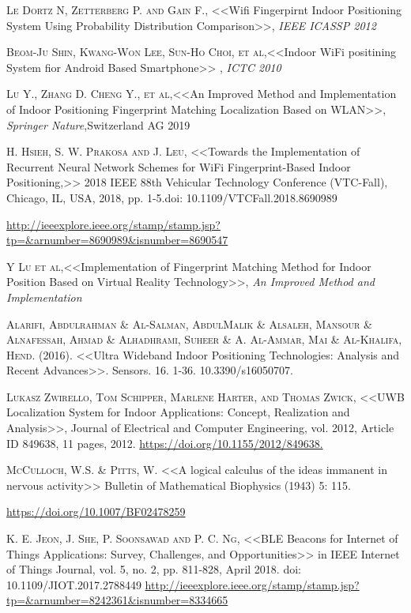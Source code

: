 \documentclass[12pt]{report}
\begin{document}
\begin{thebibliography}{X}
 \textsc{Le Dortz N, Zetterberg P. and Gain F.}, <<Wifi Fingerpirnt Indoor Positioning System Using Probability Distribution Comparison>>, \textit{IEEE ICASSP 2012}

 \textsc{Beom-Ju Shin, Kwang-Won Lee, Sun-Ho Choi, et al},<<Indoor WiFi positining System fior Android Based Smartphone>> , \textit{ICTC 2010}

 \textsc{Lu Y., Zhang D. Cheng Y., et al},<<An Improved Method and Implementation of Indoor Positioning Fingerprint Matching Localization Based on WLAN>>, \textit{Springer Nature},Switzerland AG 2019

\textsc{H. Hsieh, S. W. Prakosa and J. Leu}, <<Towards the Implementation of Recurrent Neural Network Schemes for WiFi Fingerprint-Based Indoor Positioning,>> 2018 IEEE 88th Vehicular Technology Conference (VTC-Fall), Chicago, IL, USA, 2018, pp. 1-5.doi: 10.1109/VTCFall.2018.8690989

\url{http://ieeexplore.ieee.org/stamp/stamp.jsp?tp=&arnumber=8690989&isnumber=8690547}

 \textsc{Y Lu et al},<<Implementation of Fingerprint Matching Method for Indoor Position Based on Virtual Reality Technology>>, \textit{An Improved Method and Implementation}

 \textsc{Alarifi, Abdulrahman \& Al-Salman, AbdulMalik \& Alsaleh, Mansour \& Alnafessah, Ahmad \& Alhadhrami, Suheer \& A. Al-Ammar, Mai \& Al-Khalifa, Hend}. (2016). <<Ultra Wideband Indoor Positioning Technologies: Analysis and Recent Advances>>. Sensors. 16. 1-36. 10.3390/s16050707.

 \textsc{Lukasz Zwirello, Tom Schipper, Marlene Harter, and Thomas Zwick}, <<UWB Localization System for Indoor Applications: Concept, Realization and Analysis>>, Journal of Electrical and Computer Engineering, vol. 2012, Article ID 849638, 11 pages, 2012. \url{https://doi.org/10.1155/2012/849638.}

\textsc{McCulloch, W.S. \& Pitts, W.} <<A logical calculus of the ideas immanent in nervous activity>> Bulletin of Mathematical Biophysics (1943) 5: 115. 

\url{https://doi.org/10.1007/BF02478259}

 \textsc{K. E. Jeon, J. She, P. Soonsawad and P. C. Ng}, <<BLE Beacons for Internet of Things Applications: Survey, Challenges, and Opportunities>> in IEEE Internet of Things Journal, vol. 5, no. 2, pp. 811-828, April 2018. doi: 10.1109/JIOT.2017.2788449
\url{http://ieeexplore.ieee.org/stamp/stamp.jsp?tp=&arnumber=8242361&isnumber=8334665}


\end{thebibliography}
\end{document}
